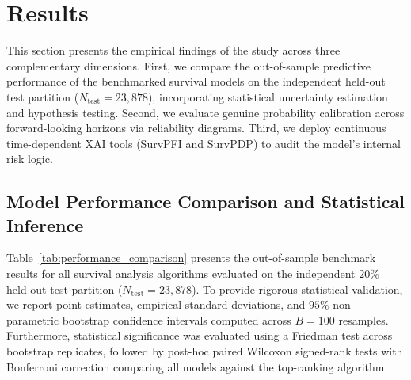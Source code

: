 \documentclass[pdflatex,iicol,sn-mathphys-ay]{sn-jnl}
\theoremstyle{thmstyleone}%
\theoremstyle{thmstyletwo}%
\theoremstyle{thmstylethree}%
\begin{document}
\section{Results}
\label{sec:results}

This section presents the empirical findings of the study across three complementary dimensions. First, we compare the out-of-sample predictive performance of the benchmarked survival models on the independent held-out test partition ($N_{\text{test}} = 23{,}878$), incorporating statistical uncertainty estimation and hypothesis testing. Second, we evaluate genuine probability calibration across forward-looking horizons via reliability diagrams. Third, we deploy continuous time-dependent XAI tools (SurvPFI and SurvPDP) to audit the model's internal risk logic.

\subsection{Model Performance Comparison and Statistical Inference}
\label{sec:performance_comparison}

Table~\ref{tab:performance_comparison} presents the out-of-sample benchmark results for all survival analysis algorithms evaluated on the independent $20\%$ held-out test partition ($N_{\text{test}} = 23{,}878$). To provide rigorous statistical validation, we report point estimates, empirical standard deviations, and $95\%$ non-parametric bootstrap confidence intervals computed across $B = 100$ resamples. Furthermore, statistical significance was evaluated using a Friedman test across bootstrap replicates, followed by post-hoc paired Wilcoxon signed-rank tests with Bonferroni correction comparing all models against the top-ranking algorithm.
\end{document}
